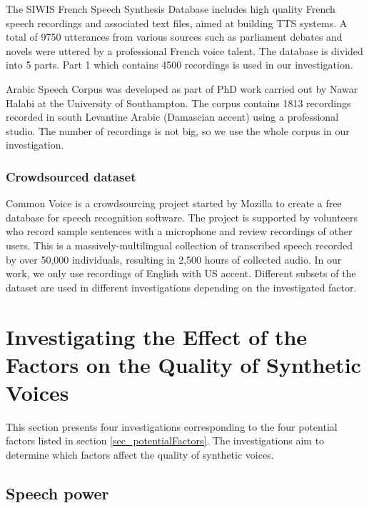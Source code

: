 \documentclass[12pt]{article}
\begin{document}
The SIWIS French Speech Synthesis Database \cite{siwis} includes high quality French speech recordings and associated text files, aimed at building TTS systems. A total of 9750 utterances from various sources such as parliament debates and novels were uttered by a professional French voice talent. The database is divided into 5 parts. Part 1 which contains 4500 recordings is used in our investigation.

Arabic Speech Corpus \cite{arabicCorpus} was developed as part of PhD work carried out by Nawar Halabi at the University of Southampton. The corpus contains 1813 recordings recorded in south Levantine Arabic (Damascian accent) using a professional studio. The number of recordings is not big, so we use the whole corpus in our investigation.

\subsubsection{Crowdsourced dataset}

Common Voice \cite{commonVoice} is a crowdsourcing project started by Mozilla to create a free database for speech recognition software. The project is supported by volunteers who record sample sentences with a microphone and review recordings of other users. This is a massively-multilingual collection of transcribed speech recorded by over 50,000 individuals, resulting in 2,500 hours of collected audio. In our work, we only use recordings of English with US accent. Different subsets of the dataset are used in different investigations depending on the investigated factor.



\clearpage
\section{Investigating the Effect of the Factors on the Quality of Synthetic Voices}\label{sec_investigations}
This section presents four investigations corresponding to the four potential factors listed in section {\ref{sec_potentialFactors}}. The investigations aim to determine which factors affect the quality of synthetic voices.

\subsection{Speech power}
\end{document}
